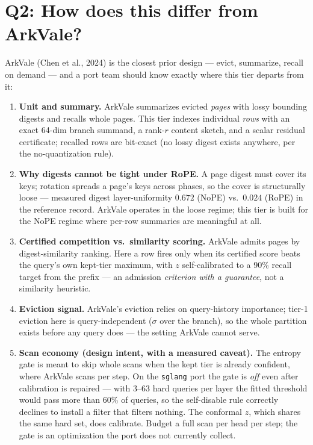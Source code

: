 \documentclass[11pt]{article}
\begin{document}
\section{Q2: How does this differ from ArkVale?}

ArkVale (Chen et al., 2024) is the closest prior design --- evict, summarize,
recall on demand --- and a port team should know exactly where this tier
departs from it:
\begin{enumerate}[itemsep=1pt]
\item \textbf{Unit and summary.} ArkVale summarizes evicted \emph{pages}
with lossy bounding digests and recalls whole pages. This tier indexes
individual \emph{rows} with an exact 64-dim branch summand, a rank-$r$
content sketch, and a scalar residual certificate; recalled rows are
bit-exact (no lossy digest exists anywhere, per the no-quantization rule).
\item \textbf{Why digests cannot be tight under RoPE.} A page digest must
cover its keys; rotation spreads a page's keys across phases, so the cover
is structurally loose --- measured digest layer-uniformity $0.672$ (NoPE)
vs.\ $0.024$ (RoPE) in the reference record. ArkVale operates in the loose
regime; this tier is built for the NoPE regime where per-row summaries are
meaningful at all.
\item \textbf{Certified competition vs.\ similarity scoring.} ArkVale admits
pages by digest-similarity ranking. Here a row fires only when its certified
score beats the query's own kept-tier maximum, with $z$ self-calibrated to a
90\% recall target from the prefix --- an admission \emph{criterion with a
guarantee}, not a similarity heuristic.
\item \textbf{Eviction signal.} ArkVale's eviction relies on query-history
importance; tier-1 eviction here is query-independent ($\sigma$ over the
branch), so the whole partition exists before any query does --- the setting
ArkVale cannot serve.
\item \textbf{Scan economy (design intent, with a measured caveat).} The
entropy gate is meant to skip whole scans when the kept tier is already
confident, where ArkVale scans per step. On the \texttt{sglang} port the
gate is \emph{off} even after calibration is repaired --- with $3$--$63$
hard queries per layer the fitted threshold would pass more than $60\%$ of
queries, so the self-disable rule correctly declines to install a filter
that filters nothing. The conformal $z$, which shares the same hard set,
does calibrate. Budget a full scan per head per step; the gate is an
optimization the port does not currently collect.
\end{enumerate}
\end{document}
